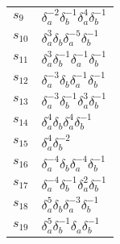 \documentclass{article}
\begin{document}
\begin{center}
\begin{tabular}{ll}
$s_{9}$ & $\delta_a^{-2}\delta_b^{-1}\delta_a^{4}\delta_b^{-1}$ \\
$s_{10}$ & $\delta_a^{3}\delta_b^{}\delta_a^{-5}\delta_b^{-1}$ \\
$s_{11}$ & $\delta_a^{3}\delta_b^{-1}\delta_a^{-1}\delta_b^{-1}$ \\
$s_{12}$ & $\delta_a^{-3}\delta_b^{}\delta_a^{-1}\delta_b^{-1}$ \\
$s_{13}$ & $\delta_a^{-3}\delta_b^{-1}\delta_a^{3}\delta_b^{-1}$ \\
$s_{14}$ & $\delta_a^{4}\delta_b^{}\delta_a^{4}\delta_b^{-1}$ \\
$s_{15}$ & $\delta_a^{4}\delta_b^{-2}$ \\
$s_{16}$ & $\delta_a^{-4}\delta_b^{}\delta_a^{-4}\delta_b^{-1}$ \\
$s_{17}$ & $\delta_a^{-4}\delta_b^{-1}\delta_a^{2}\delta_b^{-1}$ \\
$s_{18}$ & $\delta_a^{5}\delta_b^{}\delta_a^{-3}\delta_b^{-1}$ \\
$s_{19}$ & $\delta_a^{5}\delta_b^{-1}\delta_a^{}\delta_b^{-1}$ \\
\bottomrule
\end{tabular}
\end{center}

\thispagestyle{empty}
\end{document}

